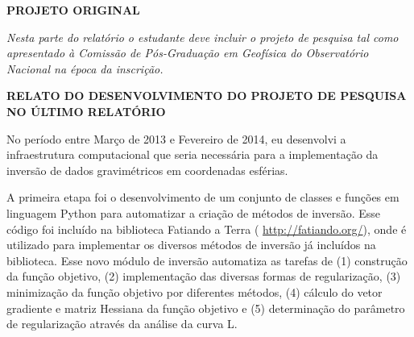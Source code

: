 \documentclass[12pt,a4paper]{article}
\begin{document}
\newpage

\begin{center}\textbf{\large PROJETO ORIGINAL}\end{center}

\vspace{1cm}

\textit{
Nesta parte do relatório o estudante deve incluir o projeto de pesquisa tal
como apresentado à Comissão de Pós-Graduação em Geofísica do Observatório
Nacional na época da inscrição.
}




\newpage

\begin{center}
\textbf{\large RELATO DO DESENVOLVIMENTO DO PROJETO DE PESQUISA NO ÚLTIMO
RELATÓRIO}
\end{center}

\vspace{1cm}

No período entre Março de 2013 e Fevereiro de 2014,
eu desenvolvi a infraestrutura computacional que seria necessária para a
implementação da inversão de dados gravimétricos em coordenadas esférias.

A primeira etapa foi o desenvolvimento de um conjunto
de classes e funções em linguagem Python para
automatizar a criação de métodos de inversão.
Esse código foi incluído na biblioteca Fatiando a Terra (
\href{http://fatiando.org/}{http://fatiando.org/}),
onde é utilizado para implementar os diversos métodos de inversão já incluídos
na biblioteca.
Esse novo módulo de inversão automatiza as tarefas de
(1) construção da função objetivo,
(2) implementação das diversas formas de regularização,
(3) minimização da função objetivo por diferentes métodos,
(4) cálculo do vetor gradiente e matriz Hessiana da função objetivo
e (5) determinação do parâmetro de regularização através da análise da curva L.
\end{document}
